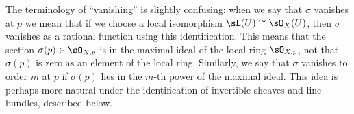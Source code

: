 The terminology of ``vanishing'' is slightly confusing: when we  say that $\sigma$ vanishes at $p$ we mean
that if we choose a local isomorphism $\sL(U) \cong \sO_X(U)$, then $\sigma$ vanishes as a rational function using this
identification. This means that the section $\sigma(p)\in \sO_{X,p}$ is in the maximal ideal of the local ring $ \sO_{X,p}$, not that $\sigma(p)$ is zero
as an element of the local ring. Similarly, we say that $\sigma$ vanishes to order $m$ at $p$ if $\sigma(p)$ lies in the
$m$-th power of the maximal ideal. This idea is perhaps more natural under the identification of invertible sheaves and line bundles, described below.

% 

